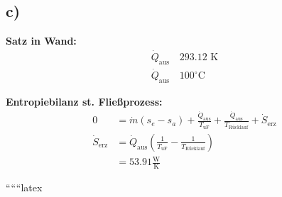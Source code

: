 

\subsection*{c)}
\textbf{Satz in Wand:}
\begin{align*}
\dot{Q}_{\text{aus}} \quad 293.12 \text{ K} \\
\dot{Q}_{\text{aus}} \quad 100^\circ \text{C}
\end{align*}

\textbf{Entropiebilanz st. Fließprozess:}
\begin{align*}
0 &= \dot{m} (s_e - s_a) + \frac{\dot{Q}_{\text{aus}}}{T_{\text{uF}}} + \frac{\dot{Q}_{\text{aus}}}{T_{\text{Rücklauf}}} + \dot{S}_{\text{erz}} \\
\dot{S}_{\text{erz}} &= \dot{Q}_{\text{aus}} \left( \frac{1}{T_{\text{uF}}} - \frac{1}{T_{\text{Rücklauf}}} \right) \\
&= 53.91 \frac{\text{W}}{\text{K}}
\end{align*}

``````latex